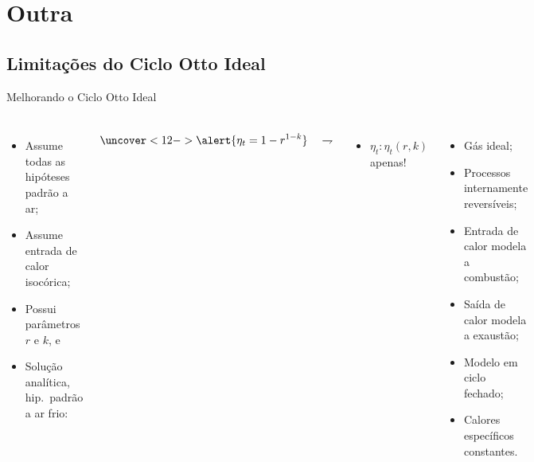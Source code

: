 \section{Outra}

\subsection{Limitações do Ciclo Otto Ideal}

    \begin{frame}{Melhorando o Ciclo Otto Ideal}\vspace*{-2em}
        \begin{columns}
        \begin{itemize}
            \item<2->  Assume todas as \alert{hipóteses padrão a ar};
            \item<8->  Assume entrada de calor \alert{isocórica};
            \item<9->  Possui parâmetros \alert{$r$} e \alert{$k$}, e
            \item<10-> Solução analítica, \alert{hip.~padrão a ar frio}:\\[\bigskipamount]
        \end{itemize}
        \begin{equation*}
            \uncover<12->{\alert{\eta_t = 1 - r^{1-k}}\quad\rightharpoondown}
        \end{equation*}%
        \vspace*{-1em}
        \begin{itemize}
            \item<13-> $\eta_t\!:\!\eta_t(r, k)$ \alert{apenas}!
        \end{itemize}
        \begin{itemize}
            \item<3->  Gás \alert{ideal};
            \item<4->  Processos \alert{internamente reversíveis};
            \item<5->  Entrada de \alert{calor} modela a combustão;
            \item<6->  Saída de \alert{calor} modela a exaustão;
            \item<7->  Modelo em \alert{ciclo fechado};
            \item<11-> Calores específicos \alert{constantes}.
        \end{itemize}
        \end{columns}
    \end{frame}
